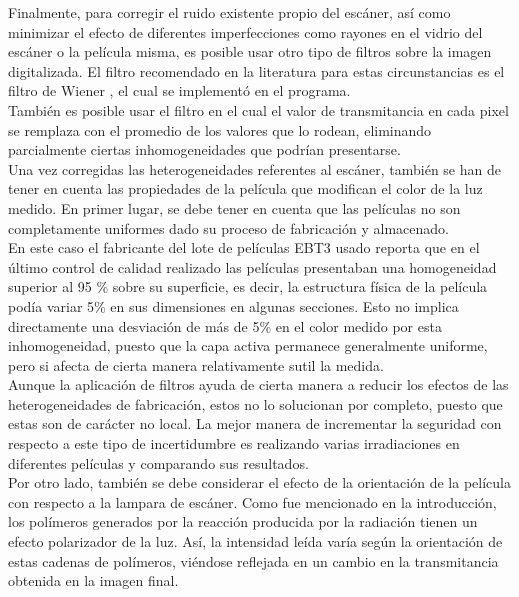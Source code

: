 Finalmente, para corregir el ruido existente propio del escáner, así como minimizar el efecto de diferentes imperfecciones como rayones en el vidrio del escáner o la película misma, es posible usar otro tipo de filtros sobre la imagen digitalizada. El filtro recomendado en la literatura para estas circunstancias es el filtro de Wiener \cite{Devic2016}, el cual se implementó en el programa. \\

También es posible usar el filtro en el cual el valor de transmitancia en cada pixel se remplaza con el promedio de los valores que lo rodean, eliminando parcialmente ciertas inhomogeneidades que podrían presentarse.\\

Una vez corregidas las heterogeneidades referentes al escáner, también se han de tener en cuenta las propiedades de la película que modifican el color de la luz medido. En primer lugar, se debe tener en cuenta que las películas no son completamente uniformes dado su proceso de fabricación y almacenado.\\

En este caso el fabricante del lote de películas EBT3 usado reporta que en el último control de calidad realizado las películas presentaban una homogeneidad superior al 95 \% sobre su superficie, es decir, la estructura física de la película podía variar 5\% en sus dimensiones en algunas secciones. Esto no implica directamente una desviación de más de 5\% en el color medido por esta inhomogeneidad, puesto que la capa activa permanece generalmente uniforme, pero si afecta de cierta manera relativamente sutil la medida. \\ 

Aunque la aplicación de filtros ayuda de cierta manera a reducir los efectos de las heterogeneidades de fabricación, estos no lo solucionan por completo, puesto que estas son de carácter no local. La mejor manera de incrementar la seguridad con respecto a este tipo de incertidumbre es realizando varias irradiaciones en  diferentes películas y comparando sus resultados.\\

Por otro lado, también se debe considerar el efecto de la orientación de la película con respecto a la lampara de escáner. Como fue mencionado en la introducción, los polímeros generados por la reacción producida por la radiación tienen un efecto polarizador de la luz. Así, la intensidad leída varía según la orientación de estas cadenas de polímeros, viéndose reflejada en un cambio en la transmitancia obtenida en la imagen final.\\








